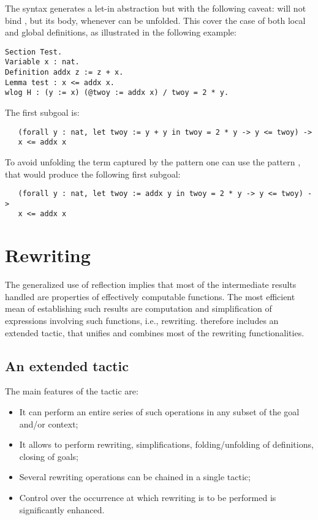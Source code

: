 \noindent
The syntax  generates a let-in abstraction but with the following
caveat:  will not bind , but its body, whenever  can be
unfolded. This cover the case of both local and global definitions, as
illustrated in the following example:

\begin{lstlisting}
Section Test.
Variable x : nat.
Definition addx z := z + x.
Lemma test : x <= addx x.
wlog H : (y := x) (@twoy := addx x) / twoy = 2 * y.
\end{lstlisting}
\noindent
The first subgoal is:
\begin{lstlisting}
   (forall y : nat, let twoy := y + y in twoy = 2 * y -> y <= twoy) ->
   x <= addx x
\end{lstlisting}
\noindent
To avoid unfolding the term captured by the pattern  one
can use the pattern , that would produce the following first
subgoal:
\begin{lstlisting}
   (forall y : nat, let twoy := addx y in twoy = 2 * y -> y <= twoy) ->
   x <= addx x
\end{lstlisting}
\section{Rewriting}\label{sec:rw}

The generalized use of reflection implies that most of the
intermediate results handled are properties of effectively computable
functions. The most efficient mean of establishing such results are
computation and simplification of expressions involving such
functions, i.e., rewriting. \ssr{} therefore includes an extended
 tactic, that unifies and combines most of the rewriting
functionalities.
\subsection{An extended  tactic}\label{ssec:extrw}
The main features of the  tactic are:
\begin{itemize}
\item  It can perform an entire series of such operations in any
  subset of the goal and/or context;
\item It allows to perform rewriting,
  simplifications, folding/unfolding of definitions, closing of goals;
\item Several rewriting operations can be chained in a single tactic;
\item Control over the occurrence at which rewriting is to be performed is
  significantly enhanced.
\end{itemize}


